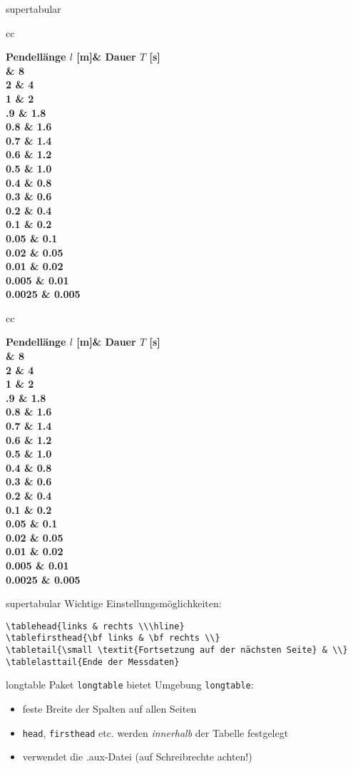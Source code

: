 \documentclass[
	vorläufig=false,
	datum=2022-11-09,
	titel={Gleitumgebungen und Tabellen},
	web=false,
	noshortverb=true,
	aspectratio=1610,
	max,
]{../tex/latexkurs-slides}
\newcommand\messdaten{
\toprule
\bf Pendellänge $l$ [m]& \bf Dauer $T$ [s]\\\midrule
4 & 8 \\
2 & 4 \\
1   & 2 \\
.9  & 1.8 \\
0.8 & 1.6 \\
0.7 & 1.4 \\
0.6 & 1.2 \\
0.5 & 1.0 \\
0.4 & 0.8 \\
0.3 & 0.6 \\
0.2 & 0.4 \\
0.1 & 0.2 \\
0.05 & 0.1 \\
0.02 & 0.05 \\
0.01 & 0.02 \\
0.005 & 0.01 \\
0.0025 & 0.005\\
\bottomrule
}
\begin{document}
\begin{frame}[fragile]{supertabular}
\begin{supertabular}{cc}
\messdaten
\end{supertabular}
\end{frame}

\begin{supertabular}{cc}
\messdaten
\end{supertabular}

\begin{frame}[fragile]{supertabular}
Wichtige Einstellungsmöglichkeiten:
\begin{lstlisting}
\tablehead{links & rechts \\\hline}
\tablefirsthead{\bf links & \bf rechts \\}
\tabletail{\small \textit{Fortsetzung auf der nächsten Seite} & \\}
\tablelasttail{Ende der Messdaten}
\end{lstlisting}
\end{frame}


\begin{frame}[fragile]{longtable}
Paket \verb|longtable| bietet Umgebung \verb|longtable|:
\begin{itemize}
\item feste Breite der Spalten auf allen Seiten
\item \verb/head/, \verb/firsthead/ etc. werden \emph{innerhalb} der Tabelle festgelegt
\item verwendet die .aux-Datei (auf Schreibrechte achten!)
\end{itemize} 
\end{frame}

\end{document}
